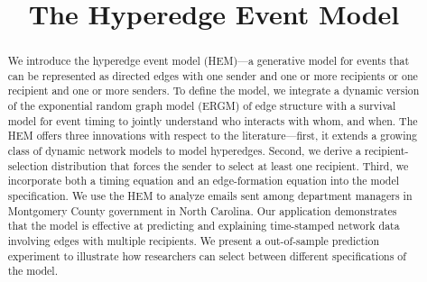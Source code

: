 \documentclass[ba]{imsart}
\numberwithin{equation}{section}
\theoremstyle{plain}
\begin{document}
\begin{frontmatter}
\title{The Hyperedge Event Model}


\begin{abstract}
We introduce the hyperedge event model (HEM)---a generative model for events that can be represented as directed edges with one sender and one or more recipients or one recipient and one or more senders. To define the model, we
integrate a dynamic version of the exponential random graph model (ERGM) of edge structure with a survival model for event timing to jointly understand who interacts with whom, and when. The HEM offers three innovations with respect to the literature---first, it extends a growing class of dynamic network models to model hyperedges. Second, we derive a recipient-selection distribution that forces the sender to select at least one recipient. Third, we incorporate both a timing equation and an edge-formation equation into the model specification. We use the HEM to analyze emails sent among department managers in Montgomery County government in North Carolina. Our application demonstrates that the model is effective at predicting and explaining time-stamped network data involving edges with multiple recipients. We present a out-of-sample prediction experiment to illustrate how researchers can select between different specifications of the model. 
\end{abstract}

\begin{keyword}[class=MSC]
\end{keyword}

\begin{keyword}
\kwd{\LaTeXe}
\end{keyword}

\end{frontmatter}
\end{document}
